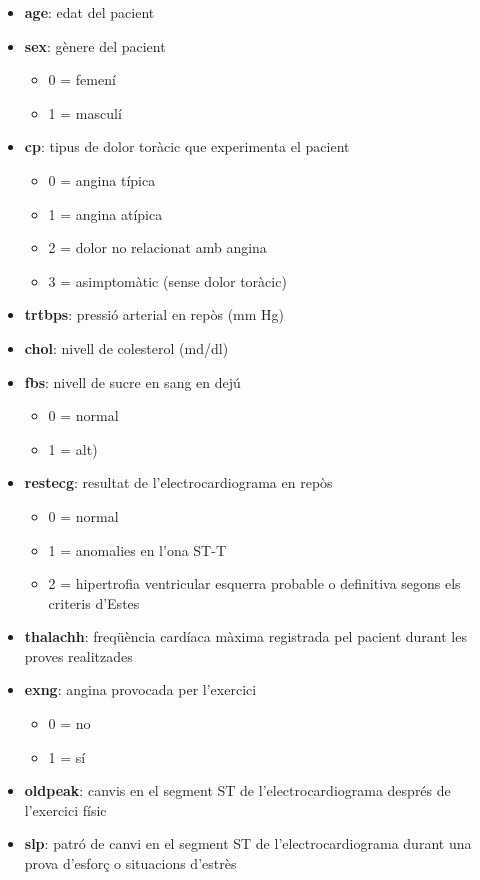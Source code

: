 \documentclass[
]{article}
\providecommand{\tightlist}{%
  \setlength{\itemsep}{0pt}\setlength{\parskip}{0pt}}
\begin{document}
\begin{itemize}
\tightlist
\item
  \textbf{age}: edat del pacient
\item
  \textbf{sex}: gènere del pacient

  \begin{itemize}
  \tightlist
  \item
    0 = femení
  \item
    1 = masculí
  \end{itemize}
\item
  \textbf{cp}: tipus de dolor toràcic que experimenta el pacient

  \begin{itemize}
  \tightlist
  \item
    0 = angina típica
  \item
    1 = angina atípica
  \item
    2 = dolor no relacionat amb angina
  \item
    3 = asimptomàtic (sense dolor toràcic)
  \end{itemize}
\item
  \textbf{trtbps}: pressió arterial en repòs (mm Hg)
\item
  \textbf{chol}: nivell de colesterol (md/dl)
\item
  \textbf{fbs}: nivell de sucre en sang en dejú

  \begin{itemize}
  \tightlist
  \item
    0 = normal
  \item
    1 = alt)
  \end{itemize}
\item
  \textbf{restecg}: resultat de l'electrocardiograma en repòs

  \begin{itemize}
  \tightlist
  \item
    0 = normal
  \item
    1 = anomalies en l'ona ST-T
  \item
    2 = hipertrofia ventricular esquerra probable o definitiva segons
    els criteris d'Estes
  \end{itemize}
\item
  \textbf{thalachh}: freqüència cardíaca màxima registrada pel pacient
  durant les proves realitzades
\item
  \textbf{exng}: angina provocada per l'exercici

  \begin{itemize}
  \tightlist
  \item
    0 = no
  \item
    1 = sí
  \end{itemize}
\item
  \textbf{oldpeak}: canvis en el segment ST de l'electrocardiograma
  després de l'exercici físic
\item
  \textbf{slp}: patró de canvi en el segment ST de l'electrocardiograma
  durant una prova d'esforç o situacions d'estrès


\end{itemize}
\end{document}
